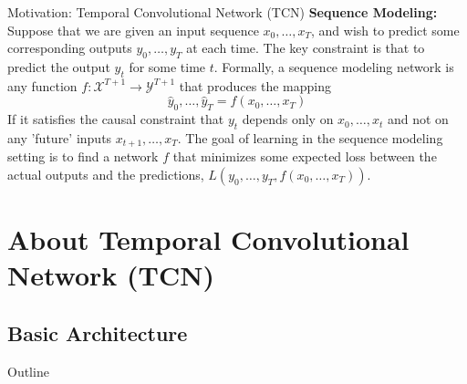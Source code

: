 \documentclass[8pt,xcolor=dvipsnames,compress]{beamer}
\begin{document}
\begin{frame}{Motivation: Temporal Convolutional Network (TCN)}
\footnotesize
\textbf{Sequence Modeling:}
Suppose that we are given an input sequence $x_0, \ldots, x_T$, and wish to predict some corresponding outputs $y_0, \ldots, y_T$ at each time. The key constraint is that to predict the output $y_t$ for some time $t$. Formally, a sequence modeling network is any function $f : \mathcal{X}^{T+1} \rightarrow \mathcal{Y}^{T+1}$ that produces the mapping
\begin{equation}
    \hat{y}_0, \ldots, \hat{y}_T = f(x_0, \ldots, x_T)
\end{equation}
If it satisfies the causal constraint that $y_t$ depends only on $x_0, \ldots, x_t$ and not on any 'future' inputs $x_{t+1}, \ldots, x_T$. The goal of learning in the sequence modeling setting is to find a network $f$ that minimizes some expected loss between the actual outputs and the predictions, $L(y_0, \ldots, y_T, f(x_0, \ldots, x_T))$.


\end{frame}



\section{About Temporal Convolutional Network (TCN)}
\subsection{Basic Architecture}
\begin{frame}{Outline}
\end{frame}
\end{document}
